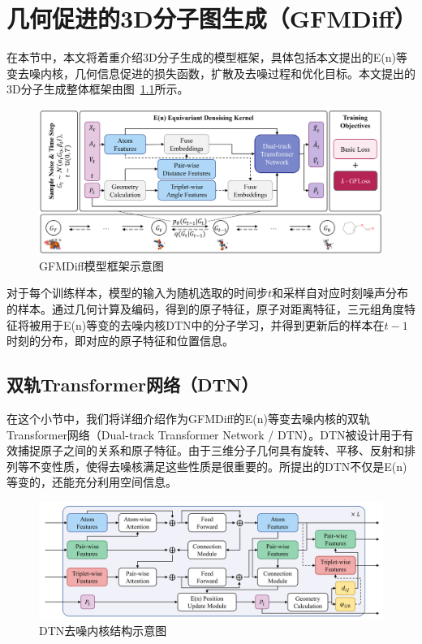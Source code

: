 \chapter[几何促进的3D分子图生成（GFMDiff）]{几何促进的3D分子图生成（GFMDiff）}
\label{chap:gfmdiff}

在本节中，本文将着重介绍3D分子生成的模型框架，具体包括本文提出的E(n)等变去噪内核，几何信息促进的损失函数，扩散及去噪过程和优化目标。本文提出的3D分子生成整体框架由图~\ref{fig:gfmdiff}所示。

\begin{figure}[h]
    \centering
    \includegraphics[width=\linewidth]{figures/overview_gfmdiff.png}
    \caption{GFMDiff模型框架示意图}
    \label{fig:gfmdiff}
  \end{figure} 

对于每个训练样本，模型的输入为随机选取的时间步$t$和采样自对应时刻噪声分布的样本。通过几何计算及编码，得到的原子特征，原子对距离特征，三元组角度特征将被用于E(n)等变的去噪内核DTN中的分子学习，并得到更新后的样本在$t-1$时刻的分布，即对应的原子特征和位置信息。

\section{双轨Transformer网络（DTN）}

在这个小节中，我们将详细介绍作为GFMDiff的E(n)等变去噪内核的双轨Transformer网络（Dual-track Transformer Network / DTN）。DTN被设计用于有效捕捉原子之间的关系和原子特征。由于三维分子几何具有旋转、平移、反射和排列等不变性质，使得去噪核满足这些性质是很重要的。所提出的DTN不仅是E(n)等变的，还能充分利用空间信息。

\begin{figure}[h]
  \centering
  \includegraphics[width=\linewidth]{figures/structure_dtn.png}
  \caption{DTN去噪内核结构示意图}
  \label{fig:dtn}
\end{figure}


